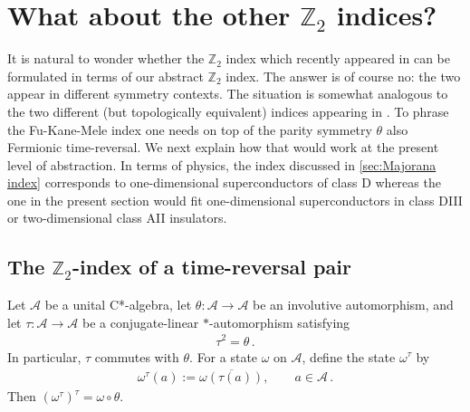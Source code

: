 \documentclass[a4paper,10pt]{article}
\numberwithin{equation}{section}
\theoremstyle{plain}
\theoremstyle{plain}
\theoremstyle{plain}
\newtheorem{cor}[cor]{\protect\corollaryname}
\theoremstyle{plain}
\theoremstyle{plain}
\theoremstyle{remark}
\theoremstyle{definition}
\providecommand{\corollaryname}{Corollary}
\newcommand{\ZZ}{\mathbb{Z}}
\newcommand{\calA}{\mathcal{A}}
\newcommand{\calN}{\mathcal{N}}
\newcommand{\eq}[1]{\begin{align*}#1\end{align*}}
\newcommand{\eql}[1]{\begin{align}#1\end{align}}
\begin{document}




\section{What about the other $\ZZ_2$ indices?}\label{sec:time reversal pair index}
It is natural to wonder whether the $\ZZ_2$ index which recently appeared in \cite{BachmannBolsRahnama2024ManyBodyFKM} can be formulated in terms of our abstract $\ZZ_2$ index. The answer is of course no: the two appear in different symmetry contexts. The situation is somewhat analogous to the two different (but topologically equivalent) indices appearing in \cite[Appendix A]{ChungShapiro2023}. To phrase the Fu-Kane-Mele index one needs on top of the parity symmetry $\theta$ also Fermionic time-reversal. We next explain how that would work at the present level of abstraction. In terms of physics, the index discussed in \cref{sec:Majorana index} corresponds to one-dimensional superconductors of class D whereas the one in the present section would fit one-dimensional superconductors in class DIII or two-dimensional class AII insulators.



\subsection{The $\ZZ_2$-index of a time-reversal pair}
\label{sec:abstract time reversal pair index}

Let $\calA$ be a unital C*-algebra, let $\theta:\calA\to\calA$ be an
involutive automorphism, and let $\tau:\calA\to\calA$ be a
conjugate-linear $*$-automorphism satisfying
\eq{
    \tau^2=\theta\,.
}
In particular, $\tau$ commutes with $\theta$. For a state $\omega$ on
$\calA$, define the state $\omega^\tau$ by
\eql{
    \omega^\tau(a)
    :=
    \overline{\omega(\tau(a))},
    \qquad a\in\calA
    \label{eq:time reversal action on states}\,.
}
Then $(\omega^\tau)^\tau=\omega\circ\theta$.
\end{document}
